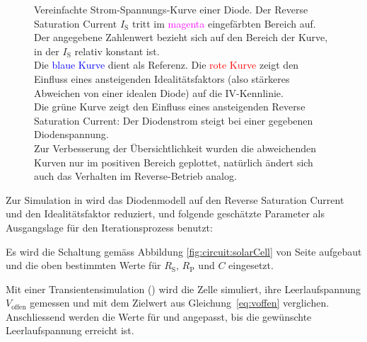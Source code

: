 \begin{figure}[h!tb]
    
    \caption{%
        Vereinfachte Strom-Spannungs-Kurve einer Diode. Der Reverse Saturation
        Current   $I_{\mathrm{S}}$   tritt   im   \textcolor{magenta}{magenta}
        eingef\"arbten Bereich auf. Der angegebene Zahlenwert bezieht sich auf
        den  Bereich  der  Kurve,  in der  $I_{\mathrm{S}}$  relativ  konstant
        ist.\protect\\
        Die    \textcolor{blue}{blaue   Kurve}    dient   als    Referenz. Die
        \textcolor{red}{rote  Kurve}  zeigt  den Einfluss  eines  ansteigenden
        Idealit\"atsfaktors  (also  st\"arkeres  Abweichen von  einer  idealen
        Diode) auf die IV-Kennlinie.\protect\\
        Die \textcolor{green!50!black}{gr\"une Kurve} zeigt den Einfluss eines
        ansteigenden  Reverse Saturation  Current: Der Diodenstrom  steigt bei
        einer gegebenen Diodenspannung.\protect\\
        Zur  Verbesserung  der  \"Ubersichtlichkeit  wurden  die  abweichenden
        Kurven nur  im positiven Bereich geplottet,  nat\"urlich \"andert sich
        auch das Verhalten im Reverse-Betrieb analog.%
    }
    \label{fig:diodeVI:IS}
\end{figure}


Zur  Simulation  in    wird das  Diodenmodell  auf  den  Reverse
Saturation  Current   und  den  Idealit\"atsfaktor  reduziert,   und  folgende
gesch\"atzte Parameter als Ausgangslage f\"ur den Iterationsprozess benutzt:

\begin{center}
\end{center}

Es wird die Schaltung gem\"ass Abbildung \ref{fig:circuit:solarCell} von Seite
\pageref{fig:circuit:solarCell} aufgebaut und die  oben bestimmten Werte f\"ur
$R_{\mathrm{S}}$, $R_{\mathrm{P}}$ und $C$ eingesetzt.

Mit einer  Transientensimulation () wird die  Zelle simuliert,
ihre  Leerlaufspannung  $V_{\mathrm{offen}}$  gemessen und  mit  dem  Zielwert
aus   Gleichung~\ref{eq:voffen}  verglichen.  Anschliessend  werden die  Werte f\"ur   und 
angepasst, bis die gew\"unschte Leerlaufspannung erreicht ist.

